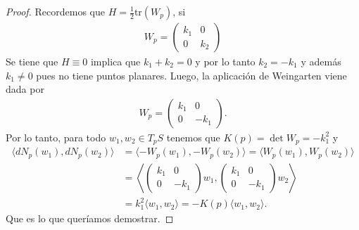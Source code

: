 \documentclass{article}
\begin{document}
\begin{proof}
    Recordemos que \( H = \frac{1}{2} \text{tr}(W_p) \), si \begin{align*}
        W_p = \begin{pmatrix}
                  k_1 & 0   \\
                  0   & k_2
              \end{pmatrix}
    \end{align*}
    Se tiene que \( H \equiv 0 \) implica que \( k_1 + k_2 = 0 \) y por lo tanto \( k_2 = -k_1 \) y además \( k_1 \neq 0 \) pues no tiene puntos planares. Luego, la aplicación de Weingarten viene dada por \begin{align*}
        W_p = \begin{pmatrix}
                  k_1 & 0    \\
                  0   & -k_1
              \end{pmatrix}.
    \end{align*}
    Por lo tanto, para todo \( w_1, w_2 \in T_p S \) tenemos que \( K(p) = \det W_p = -k_1^2 \) y \begin{align*}
        \langle dN_p(w_1), dN_p(w_2) \rangle & = \langle -W_p(w_1), -W_p(w_2) \rangle = \langle W_p(w_1), W_p(w_2) \rangle \\
                                             & = \left \langle \begin{pmatrix}
                                                                   k_1 & 0    \\
                                                                   0   & -k_1
                                                               \end{pmatrix} w_1, \begin{pmatrix}
                                                                                      k_1 & 0    \\
                                                                                      0   & -k_1
                                                                                  \end{pmatrix} w_2 \right \rangle         \\
                                             & = k_1^2 \langle w_1, w_2 \rangle = -K(p) \langle w_1, w_2 \rangle.
    \end{align*}
    Que es lo que queríamos demostrar.
\end{proof}

\vspace{1em}
\end{document}
